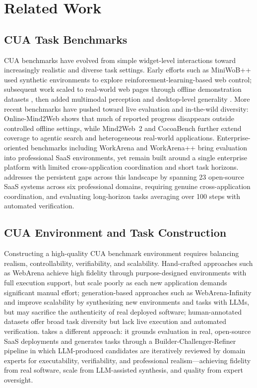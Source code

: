 \section{Related Work}
\label{rw}

\subsection{CUA Task Benchmarks}

CUA benchmarks have evolved from simple widget-level interactions toward increasingly realistic and diverse task settings.
Early efforts such as MiniWoB++ \cite{miniwob} used synthetic environments to explore reinforcement-learning-based web control; subsequent work scaled to real-world web pages through offline demonstration datasets \cite{mind2web,webarena}, then added multimodal perception \cite{visualwebarena} and desktop-level generality \cite{osworld}.
More recent benchmarks have pushed toward live evaluation and in-the-wild diversity: Online-Mind2Web \cite{onlinemind2web} shows that much of reported progress disappears outside controlled offline settings, while Mind2Web~2 \cite{mind2web2} and CocoaBench \cite{cocoabench} further extend coverage to agentic search and heterogeneous real-world applications.
Enterprise-oriented benchmarks including WorkArena and WorkArena++ \cite{workarena,workarenaplus} bring evaluation into professional SaaS environments, yet remain built around a single enterprise platform with limited cross-application coordination and short task horizons.
\datasetname addresses the persistent gaps across this landscape by spanning 23 open-source SaaS systems across six professional domains, requiring genuine cross-application coordination, and evaluating long-horizon tasks averaging over 100 steps with automated verification.

\subsection{CUA Environment and Task Construction}

Constructing a high-quality CUA benchmark environment requires balancing realism, controllability, verifiability, and scalability.
Hand-crafted approaches such as WebArena \cite{webarena} achieve high fidelity through purpose-designed environments with full execution support, but scale poorly as each new application demands significant manual effort; generation-based approaches such as WebArena-Infinity and \cite{wainfinity} improve scalability by synthesizing new environments and tasks with LLMs, but may sacrifice the authenticity of real deployed software; human-annotated datasets \cite{mind2web} offer broad task diversity but lack live execution and automated verification.
\datasetname takes a different approach: it grounds evaluation in real, open-source SaaS deployments and generates tasks through a Builder-Challenger-Refiner pipeline in which LLM-produced candidates are iteratively reviewed by domain experts for executability, verifiability, and professional realism---achieving fidelity from real software, scale from LLM-assisted synthesis, and quality from expert oversight.

